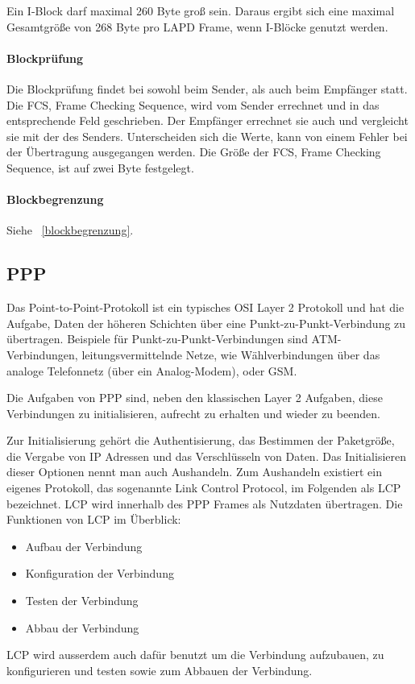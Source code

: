 \documentclass[12pt, a4paper, ngerman]{article}
\newcommand{\fcs}{FCS, Frame Checking Sequence,\xspace}
\begin{document}
Ein I-Block darf maximal 260 Byte groß sein. Daraus ergibt sich eine maximal Gesamtgröße von 268 Byte pro LAPD Frame, wenn I-Blöcke genutzt werden.

\paragraph{Blockprüfung}
Die Blockprüfung findet bei sowohl beim Sender, als auch beim Empfänger statt. Die \fcs wird vom Sender errechnet und in das entsprechende Feld geschrieben. Der Empfänger errechnet sie auch und vergleicht sie mit der des Senders. Unterscheiden sich die Werte, kann von einem Fehler bei der Übertragung ausgegangen werden. Die Größe der \fcs ist auf zwei Byte festgelegt.
 
\paragraph{Blockbegrenzung}
Siehe ~\ref{blockbegrenzung}.
 
\subsection{PPP}

Das Point-to-Point-Protokoll ist ein typisches OSI Layer 2 Protokoll und hat die Aufgabe, Daten der höheren Schichten über eine Punkt-zu-Punkt-Verbindung zu übertragen. Beispiele für Punkt-zu-Punkt-Verbindungen sind ATM-Verbindungen, leitungsvermittelnde Netze, wie Wählverbindungen über das analoge Telefonnetz (über ein Analog-Modem), oder GSM.

Die Aufgaben von PPP sind, neben den klassischen Layer 2 Aufgaben, diese Verbindungen zu initialisieren, aufrecht zu erhalten und wieder zu beenden.

Zur Initialisierung gehört die Authentisierung, das Bestimmen der Paketgröße, die Vergabe von IP Adressen und das Verschlüsseln von Daten.  
Das Initialisieren dieser Optionen nennt man auch Aushandeln. Zum Aushandeln existiert ein eigenes Protokoll, das sogenannte Link Control Protocol, im Folgenden als LCP bezeichnet. LCP wird innerhalb des PPP Frames als Nutzdaten übertragen.
Die Funktionen von LCP im Überblick:
\begin{itemize}
	\item Aufbau der Verbindung
	\item Konfiguration der Verbindung
	\item Testen der Verbindung
	\item Abbau der Verbindung
\end{itemize}
LCP wird ausserdem auch dafür benutzt um die Verbindung aufzubauen, zu konfigurieren und testen sowie zum Abbauen der Verbindung. 
\end{document}
